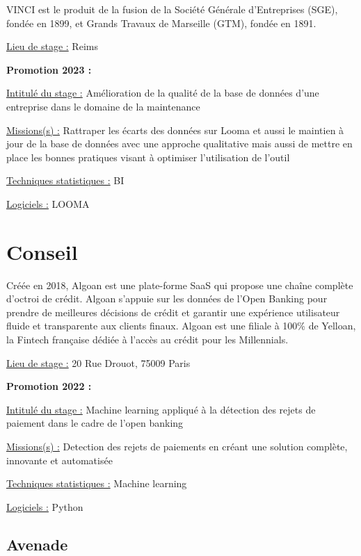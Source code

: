 \documentclass[
  letterpaper,
  DIV=11,
  numbers=noendperiod]{scrreprt}
\begin{document}
VINCI est le produit de la fusion de la Société Générale d'Entreprises
(SGE), fondée en 1899, et Grands Travaux de Marseille (GTM), fondée en
1891.

\uline{Lieu de stage :} Reims

\textbf{Promotion 2023 :}

\uline{Intitulé du stage :} Amélioration de la qualité de la base de
données d'une entreprise dans le domaine de la maintenance

\uline{Missions(s) :} Rattraper les écarts des données sur Looma et
aussi le maintien à jour de la base de données avec une approche
qualitative mais aussi de mettre en place les bonnes pratiques visant à
optimiser l'utilisation de l'outil

\uline{Techniques statistiques :} BI

\uline{Logiciels :} LOOMA


\hypertarget{conseil}{%
\chapter{Conseil}\label{conseil}}

Créée en 2018, Algoan est une plate-forme SaaS qui propose une chaîne
complète d'octroi de crédit. Algoan s'appuie sur les données de l'Open
Banking pour prendre de meilleures décisions de crédit et garantir une
expérience utilisateur fluide et transparente aux clients finaux. Algoan
est une filiale à 100\% de Yelloan, la Fintech française dédiée à
l'accès au crédit pour les Millennials.

\uline{Lieu de stage :} 20 Rue Drouot, 75009 Paris

\textbf{Promotion 2022 :}

\uline{Intitulé du stage :} Machine learning appliqué à la détection des
rejets de paiement dans le cadre de l'open banking

\uline{Missions(s) :} Detection des rejets de paiements en créant une
solution complète, innovante et automatisée

\uline{Techniques statistiques :} Machine learning

\uline{Logiciels :} Python

\hypertarget{avenade}{%
\section{\texorpdfstring{\textbf{Avenade}}{Avenade}}\label{avenade}}
\end{document}
